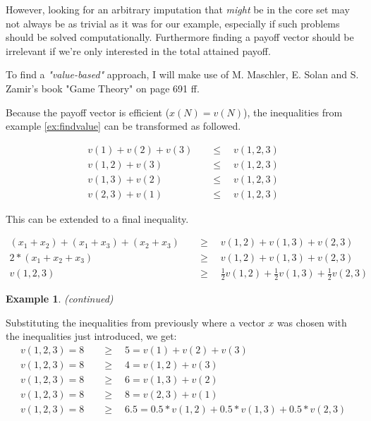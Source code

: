 \documentclass[10pt,a4paper,titlepage]{article}
\theoremstyle{plain}
\theoremstyle{definition}
\newtheorem{example}[thm]{Example} %
\begin{document}
However, looking for an arbitrary imputation that \textit{might} be in the core set may not always be as trivial as it was for our example, especially if such problems should be solved computationally. Furthermore finding a payoff vector should be irrelevant if we're only interested in the total attained payoff.

To find a \textit{"value-based"} approach, I will make use of M. Maschler, E. Solan and S. Zamir's book "Game Theory" \cite{maschler} on page 691 ff.

Because the payoff vector is efficient ($x(N) = v(N)$), the inequalities from example \ref{ex:findvalue} can be transformed as followed.

\begin{align}
    v(1) + v(2) + v(3) &\quad\leq\quad v(1, 2, 3)\\
    v(1, 2) + v(3) &\quad\leq\quad v(1, 2, 3)\\
    v(1, 3) + v(2) &\quad\leq\quad v(1, 2, 3)\\
    v(2, 3) + v(1) &\quad\leq\quad v(1, 2, 3)
\end{align}

This can be extended to a final inequality.

\begin{align*}
    (x_1+x_2)+(x_1+x_3)+(x_2+x_3) &\quad \geq \quad v(1, 2) + v(1, 3) + v(2, 3)\\[6pt]
    2*(x_1+x_2+x_3) &\quad \geq \quad v(1, 2) + v(1, 3) + v(2, 3)\\
    v(1, 2, 3) &\quad \geq \quad \frac{1}{2} v(1, 2) + \frac{1}{2} v(1, 3) + \frac{1}{2} v(2, 3)
\end{align*}

\addtocounter{thm}{-1}
\begin{example}\label{ex:valuebased}
    \textit{(continued)}

    Substituting the inequalities from previously where a vector $x$ was chosen with the inequalities just introduced, we get:
    \begin{align*}
        v(1, 2, 3) = 8\quad & \geq \quad 5 = v(1) + v(2) + v(3)\\
        v(1, 2, 3) = 8\quad & \geq \quad 4 = v(1, 2) + v(3)\\
        v(1, 2, 3) = 8\quad & \geq \quad 6 = v(1, 3) + v(2)\\
        v(1, 2, 3) = 8\quad & \geq \quad 8 = v(2, 3) + v(1)\\
        v(1, 2, 3) = 8\quad & \geq \quad 6.5 = 0.5*v(1, 2) + 0.5*v(1, 3) + 0.5*v(2, 3)
    \end{align*}
\end{example}
\end{document}
